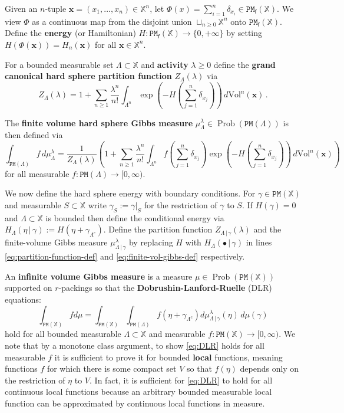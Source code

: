 \documentclass[11pt]{amsart}
\theoremstyle{definition}
\theoremstyle{remark}
\newcommand{\bX}{\mathbb{X}}
\newcommand{\Mf}{\cP_{\mathsf{f}}}
\newcommand{\cP}{\mathtt{PM}}
\newcommand{\Prob}{\operatorname{Prob}}
\newcommand{\Lam}{\Lambda}
\newcommand{\mes}{\mathrm{Vol}}
\begin{document}
Given an $n$-tuple $\mathbf{x}=(x_1,\ldots, x_n) \in \bX^n$, let $\Phi(x)=\sum_{i=1}^n \delta_{x_i} \in \Mf(\bX)$. We view $\Phi$ as a continuous map from the disjoint union $\sqcup_{n \geq 0} \bX^n$ onto $\Mf(\bX)$. Define the {\bf energy} (or Hamiltonian) $H: \Mf(\bX) \to \{0,+\infty\}$ by setting $H(\Phi(\mathbf{x}))=H_n(\mathbf{x})$ for all $\mathbf{x} \in \bX^n$. 


For a bounded measurable set $\Lambda \subset \bX$ and \textbf{activity} $\lambda \geq 0$ define the \textbf{grand canonical hard sphere partition function} $Z_\Lambda(\lambda)$ via \begin{equation}\label{eq:partition-function-def}
    Z_\Lambda(\lambda) = 1 + \sum_{n \geq 1} \frac{\lambda^n}{n!} \int_{\Lambda^n} \exp\left(-H\left( \sum_{j = 1}^n \delta_{x_j}\right) \right)\,d\mes^n(\mathbf{x})\,.
\end{equation}

The \textbf{finite volume hard sphere Gibbs measure} $\mu_{\Lambda}^\lambda \in \Prob(\cP(\Lambda))$ is then defined via 
%
\begin{equation}\label{eq:finite-vol-gibbs-def}
    \int_{\cP(\Lam)} f\,d\mu_{\Lam}^\lambda = \frac{1}{Z_\Lambda(\lambda)}\left(1 + \sum_{n \geq 1}\frac{\lambda^n}{n!}\int_{\Lambda^n} f\left(\sum_{j = 1}^n \delta_{x_j} \right) \exp\left(-H\left(\sum_{j = 1}^n \delta_{x_j} \right) \right)\,d\mes^n(\mathbf{x}) \right)
\end{equation}
%
for all measurable $f:\cP(\Lambda) \to [0,\infty).$  

We now define the hard sphere energy with boundary conditions.  For $\gamma \in \cP(\bX)$ and  measurable $S \subset \bX$ write $\gamma_S := \gamma|_S$ for the restriction of $\gamma$ to $S$. If  $H(\gamma) = 0$ and $\Lambda \subset \bX$ is bounded then define the conditional energy via $H_{\Lambda}(\eta \,|\, \gamma) := H(\eta + \gamma_{\Lambda^c})$. Define the partition function $Z_{\Lambda\,|\,\gamma}(\lambda)$ and the finite-volume Gibbs measure $\mu_{\Lambda\,|\,\gamma}^\lambda$ by replacing $H$ with $H_\Lambda(\bullet \,|\,\gamma)$ in lines \eqref{eq:partition-function-def} and \eqref{eq:finite-vol-gibbs-def} respectively.


An \textbf{infinite volume Gibbs measure} is a measure $\mu \in \Prob(\cP(\bX))$ supported on $r$-packings so that the \textbf{Dobrushin-Lanford-Ruelle} (DLR) equations: 
\begin{equation}\label{eq:DLR}
    \int_{\cP(\bX)} f d\mu = \int_{\cP(\bX)}  \int_{\cP(\Lambda)}f(\eta + \gamma_{\Lambda^c}) d\mu_{\Lambda\,|\,\gamma}^\lambda(\eta) \,d\mu(\gamma)
\end{equation}
%
hold for all bounded measurable $\Lambda \subset \bX$ and measurable $f:\cP(\bX) \to [0,\infty).$  We note that by a monotone class argument, to show \eqref{eq:DLR} holds for all measurable $f$ it is sufficient to prove it for bounded \textbf{local} functions, meaning functions $f$ for which there is some compact set $V$ so that $f(\eta)$ depends only on the restriction of $\eta$ to $V$. In fact, it is sufficient for \eqref{eq:DLR} to hold for all continuous local functions because an arbitrary bounded measurable local function can be approximated by continuous local functions in measure. 
\end{document}
